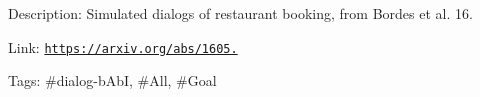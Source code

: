 Description\+: Simulated dialogs of restaurant booking, from Bordes et al. \textquotesingle{}16.

Link\+: \href{https://arxiv.org/abs/1605.07683}{\tt https\+://arxiv.\+org/abs/1605.}

Tags\+: \#dialog-\/b\+AbI, \#\+All, \#\+Goal 